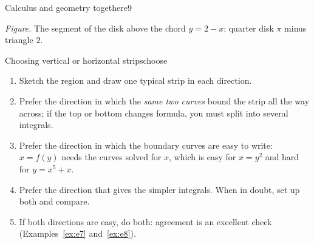 \documentclass[11pt]{article}
\begin{document}
\begin{exmp}{Calculus and geometry together}{e9}
\begin{center}
\par\small\emph{Figure.} The segment of the disk above the chord $y=2-x$: quarter disk $\pi$ minus triangle $2$.
\end{center}
\end{exmp}

\begin{proc}{Choosing vertical or horizontal strips}{choose}
\begin{enumerate}[nosep]
  \item Sketch the region and draw one typical strip in each direction.
  \item Prefer the direction in which the \emph{same two curves} bound the strip all the way across; if the top or bottom changes formula, you must split into several integrals.
  \item Prefer the direction in which the boundary curves are easy to write: $x=f(y)$ needs the curves solved for $x$, which is easy for $x=y^2$ and hard for $y=x^5+x$.
  \item Prefer the direction that gives the simpler integrals. When in doubt, set up both and compare.
  \item If both directions are easy, do both: agreement is an excellent check (Examples~\ref{ex:e7} and~\ref{ex:e8}).
\end{enumerate}
\end{proc}
\end{document}
